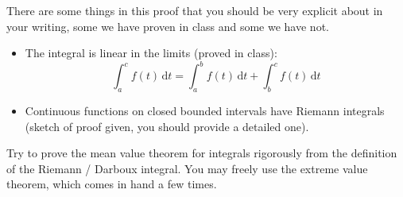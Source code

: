 \documentclass{article}
\begin{document}
        There are some things in this proof that you should be very explicit
        about in your writing, some we have proven in class and some we have
        not.
        \begin{itemize}
            \item
                The integral is linear in the limits (proved in class):
                \begin{equation}
                    \int_{a}^{c}f(t)\,\textrm{d}t
                    =\int_{a}^{b}f(t)\,\textrm{d}t+\int_{b}^{c}f(t)\,\textrm{d}t
                \end{equation}
            \item
                Continuous functions on closed bounded intervals have
                Riemann integrals (sketch of proof given, you should provide
                a detailed one).
        \end{itemize}
        Try to prove the mean value theorem for integrals rigorously from the
        definition of the Riemann / Darboux integral. You may freely use
        the extreme value theorem, which comes in hand a few times.
\end{document}
